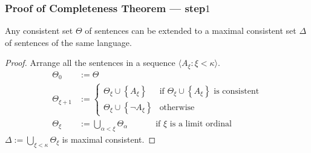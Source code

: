 \documentclass[UTF8,aspectratio=43,11pt,colorlinks,compress,openany]{beamer}%
\begin{document}
\begin{frame}\frametitle{Proof of Completeness Theorem --- step$1$}
	\begin{lemma}
		Any consistent set $\Theta$ of sentences can be extended to a maximal consistent set $\Delta$ of sentences of the same language.
	\end{lemma}
	\begin{proof}
		Arrange all the sentences in a sequence $\langle A_\xi: \xi<\kappa\rangle$.
		\begin{align*}
		\Theta_0&:=\Theta\\
		\Theta_{\xi+1}&:=
		\begin{cases}
		\Theta_\xi\cup\left\{A_\xi\right\}&\text{if $\Theta_\xi\cup\left\{A_\xi\right\}$ is consistent}\\
		\Theta_\xi\cup\left\{\neg A_\xi\right\}&\text{otherwise}
		\end{cases}\\
		\Theta_\xi&:=\bigcup\limits_{\alpha<\xi}\Theta_\alpha\;\quad\qquad\text{if $\xi$ is a limit ordinal}
		\end{align*}
		$\Delta:=\bigcup\limits_{\xi<\kappa}\Theta_\xi$ is maximal consistent.
	\end{proof}
\end{frame}
\end{document}
